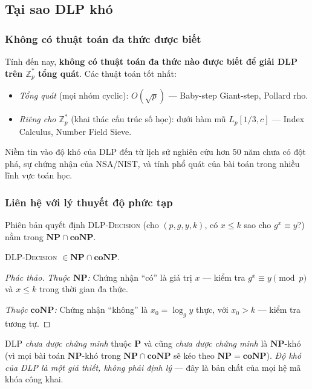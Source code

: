 \documentclass[../DoAn.tex]{subfiles}
\begin{document}
\subsection{Tại sao DLP khó}
\label{subsec:dlp-hardness}

\subsubsection{Không có thuật toán đa thức được biết}

Tính đến nay, \textbf{không có thuật toán đa thức nào được biết để giải DLP trên $\mathbb{Z}_p^*$ tổng quát}. Các thuật toán tốt nhất:
\begin{itemize}[leftmargin=*]
	\item \emph{Tổng quát} (mọi nhóm cyclic): $O(\sqrt{p})$ --- Baby-step Giant-step, Pollard rho.
	\item \emph{Riêng cho $\mathbb{Z}_p^*$} (khai thác cấu trúc số học): dưới hàm mũ $L_p[1/3, c]$ --- Index Calculus, Number Field Sieve.
\end{itemize}
Niềm tin vào độ khó của DLP đến từ lịch sử nghiên cứu hơn $50$ năm chưa có đột phá, sự chứng nhận của NSA/NIST, và tính phổ quát của bài toán trong nhiều lĩnh vực toán học.

\subsubsection{Liên hệ với lý thuyết độ phức tạp}

Phiên bản quyết định \textsc{DLP-Decision} (cho $(p, g, y, k)$, có $x \leq k$ sao cho $g^x \equiv y$?) nằm trong $\mathbf{NP} \cap \mathbf{coNP}$.

\begin{proposition}
\textsc{DLP-Decision} $\in \mathbf{NP} \cap \mathbf{coNP}$.
\end{proposition}

\begin{proof}[Phác thảo]
\emph{Thuộc $\mathbf{NP}$:} Chứng nhận ``có'' là giá trị $x$ --- kiểm tra $g^x \equiv y \pmod{p}$ và $x \leq k$ trong thời gian đa thức.

\emph{Thuộc $\mathbf{coNP}$:} Chứng nhận ``không'' là $x_0 = \log_g y$ thực, với $x_0 > k$ --- kiểm tra tương tự.
\end{proof}

\begin{remark}
DLP \emph{chưa được chứng minh} thuộc $\mathbf{P}$ và cũng \emph{chưa được chứng minh} là $\mathbf{NP}$-khó (vì mọi bài toán $\mathbf{NP}$-khó trong $\mathbf{NP} \cap \mathbf{coNP}$ sẽ kéo theo $\mathbf{NP} = \mathbf{coNP}$). \emph{Độ khó của DLP là một giả thiết, không phải định lý} --- đây là bản chất của mọi hệ mã khóa công khai.
\end{remark}
\end{document}
